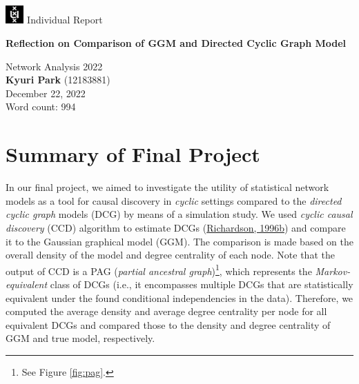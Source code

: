 \documentclass[
]{article}
\author{}
\date{\vspace{-2.5em}}
\begin{document}

\includegraphics[width=0.7cm]{img/logouva.png}
\Large Individual Report

\begin{centering}
\vspace{1cm}
\LARGE
{\bf Reflection on Comparison of GGM and Directed Cyclic Graph Model}

\vspace{0.5cm}
\Large
Network Analysis 2022 \\

\vspace{1cm}
\Large
\textbf{Kyuri Park} (12183881) \\

December 22, 2022 \\
\vspace{0.5cm}
\large {Word count: 994}  

\vspace{1cm}

\end{centering}


\normalsize

\vspace{1cm}
\setcounter{tocdepth}{2}
\renewcommand{\contentsname}{Table of Contents}
\tableofcontents

\newpage

\hypertarget{summary-of-final-project}{%
\section{Summary of Final Project}\label{summary-of-final-project}}

In our final project, we aimed to investigate the utility of statistical network models as a tool for causal discovery in \emph{cyclic} settings compared to the \emph{directed cyclic graph} models (DCG) by means of a simulation study.
We used \emph{cyclic causal discovery} (CCD) algorithm to estimate DCGs (\protect\hyperlink{ref-richardson1996}{Richardson, 1996b}) and compare it to the Gaussian graphical model (GGM). The comparison is made based on the overall density of the model and degree centrality of each node. Note that the output of CCD is a PAG (\emph{partial ancestral graph})\footnote{See Figure \ref{fig:pag}.}, which represents the \emph{Markov-equivalent} class of DCGs (i.e., it encompasses multiple DCGs that are statistically equivalent under the found conditional independencies in the data). Therefore, we computed the average density and average degree centrality per node for all equivalent DCGs and compared those to the density and degree centrality of GGM and true model, respectively.
\end{document}
